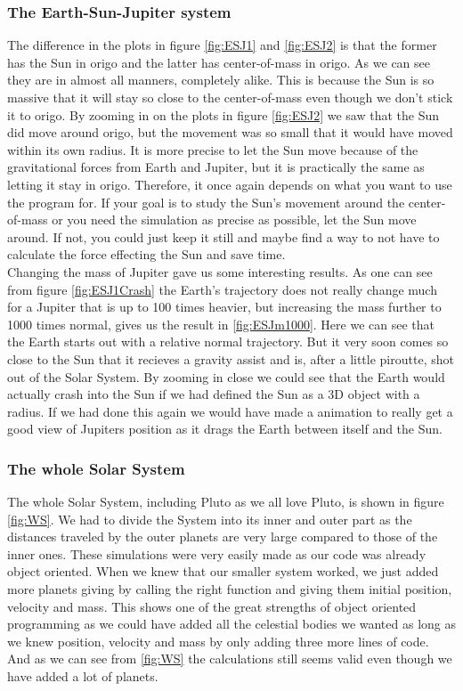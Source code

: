 \documentclass{article}
\begin{document}
\subsubsection{The Earth-Sun-Jupiter system}
The difference in the plots in figure \ref{fig:ESJ1} and \ref{fig:ESJ2} is that the former has the Sun in origo and the latter has center-of-mass in origo. As we can see they are in almost all manners, completely alike. This is because the Sun is so massive that it will stay so close to the center-of-mass even though we don't stick it to origo. By zooming in on the plots in figure \ref{fig:ESJ2} we saw that the Sun did move around origo, but the movement was so small that it would have moved within its own radius. It is more precise to let the Sun move because of the gravitational forces from Earth and Jupiter, but it is practically the same as letting it stay in origo. Therefore, it once again depends on what you want to use the program for. If your goal is to study the Sun's movement around the center-of-mass or you need the simulation as precise as possible, let the Sun move around. If not, you could just keep it still and maybe find a way to not have to calculate the force effecting the Sun and save time. \\

Changing the mass of Jupiter gave us some interesting results. As one can see from figure \ref{fig:ESJ1Crash} the Earth's trajectory does not really change much for a Jupiter that is up to 100 times heavier, but increasing the mass further to 1000 times normal, gives us the result in \ref{fig:ESJm1000}. Here we can see that the Earth starts out with a relative normal trajectory. But it very soon comes so close to the Sun that it recieves a gravity assist and is, after a little piroutte, shot out of the Solar System. By zooming in close we could see that the Earth would actually crash into the Sun if we had defined the Sun as a 3D object with a radius. If we had done this again we would have made a animation to really get a good view of Jupiters position as it drags the Earth between itself and the Sun.

\subsubsection{The whole Solar System}
The whole Solar System, including Pluto as we all love Pluto, is shown in figure \ref{fig:WS}. We had to divide the System into its inner and outer part as the distances traveled by the outer planets are very large compared to those of the inner ones. These simulations were very easily made as our code was already object oriented. When we knew that our smaller system worked, we just added more planets giving by calling the right function and giving them initial position, velocity and mass. This shows one of the great strengths of object oriented programming as we could have added all the celestial bodies we wanted as long as we knew position, velocity and mass by only adding three more lines of code. And as we can see from \ref{fig:WS} the calculations still seems valid even though we have added a lot of planets.
\end{document}
